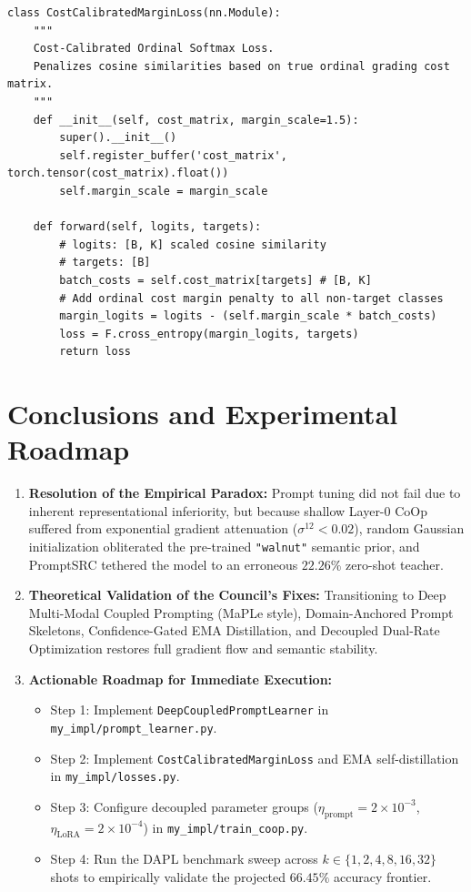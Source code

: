 \documentclass[letterpaper,11pt,leqno]{article}
\begin{document}
\begin{verbatim}
class CostCalibratedMarginLoss(nn.Module):
    """
    Cost-Calibrated Ordinal Softmax Loss.
    Penalizes cosine similarities based on true ordinal grading cost matrix.
    """
    def __init__(self, cost_matrix, margin_scale=1.5):
        super().__init__()
        self.register_buffer('cost_matrix', torch.tensor(cost_matrix).float())
        self.margin_scale = margin_scale
        
    def forward(self, logits, targets):
        # logits: [B, K] scaled cosine similarity
        # targets: [B]
        batch_costs = self.cost_matrix[targets] # [B, K]
        # Add ordinal cost margin penalty to all non-target classes
        margin_logits = logits - (self.margin_scale * batch_costs)
        loss = F.cross_entropy(margin_logits, targets)
        return loss
\end{verbatim}

\newpage
\section{Conclusions and Experimental Roadmap}

\begin{enumerate}
    \item \textbf{Resolution of the Empirical Paradox:} Prompt tuning did not fail due to inherent representational inferiority, but because shallow Layer-0 CoOp suffered from exponential gradient attenuation ($\sigma^{12} < 0.02$), random Gaussian initialization obliterated the pre-trained \texttt{"walnut"} semantic prior, and PromptSRC tethered the model to an erroneous $22.26\%$ zero-shot teacher.
    \item \textbf{Theoretical Validation of the Council's Fixes:} Transitioning to Deep Multi-Modal Coupled Prompting (MaPLe style), Domain-Anchored Prompt Skeletons, Confidence-Gated EMA Distillation, and Decoupled Dual-Rate Optimization restores full gradient flow and semantic stability.
    \item \textbf{Actionable Roadmap for Immediate Execution:}
    \begin{itemize}
        \item Step 1: Implement \texttt{DeepCoupledPromptLearner} in \texttt{my\_impl/prompt\_learner.py}.
        \item Step 2: Implement \texttt{CostCalibratedMarginLoss} and EMA self-distillation in \texttt{my\_impl/losses.py}.
        \item Step 3: Configure decoupled parameter groups ($\eta_\mathrm{prompt}=2\times 10^{-3}$, $\eta_\mathrm{LoRA}=2\times 10^{-4}$) in \texttt{my\_impl/train\_coop.py}.
        \item Step 4: Run the DAPL benchmark sweep across $k \in \{1, 2, 4, 8, 16, 32\}$ shots to empirically validate the projected $66.45\%$ accuracy frontier.
    \end{itemize}
\end{enumerate}
\end{document}
